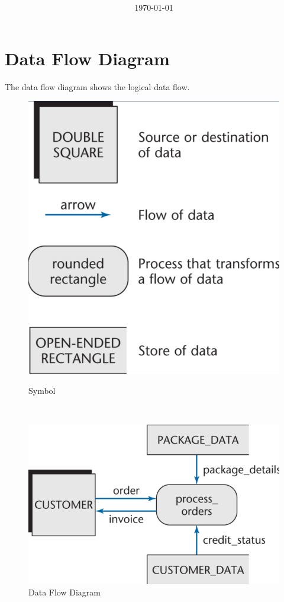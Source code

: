 \documentclass[11pt]{article}
\title{\textbf{\Topic}}
\author{\Name}
\date{\today}
\begin{document}
\maketitle
\noindent\makebox[\linewidth]{\rule[8pt]{5in}{0.5pt}}

\section*{Data Flow Diagram}

The data flow diagram shows the logical data flow.

\begin{figure}[h]
	\begin{minipage}[t]{0.4\linewidth}
	\centering 
	\includegraphics[width=1.2\textwidth]{images/DataFlowDiagramSymbol.png}
	\caption{Symbol}
	\label{fig:DataFlowDiagramSymbol}
	\end{minipage} 
	\hfill
	\begin{minipage}[t]{0.4\linewidth}
	\centering
	\includegraphics[width=1.2\textwidth]{images/DataFlowDiagram.png}
	\caption{Data Flow Diagram} 
	\label{fig:DataFlowDiagram}
	\end{minipage}
\end{figure}
\end{document}
